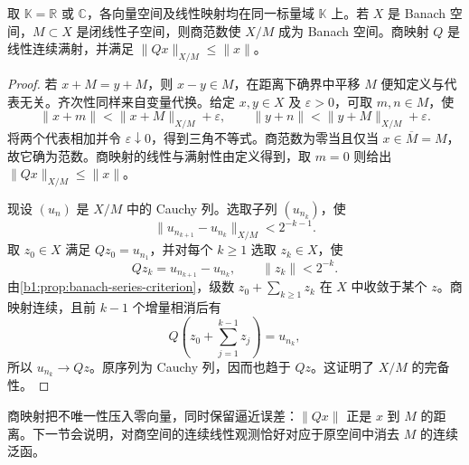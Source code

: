\begin{theorem}[闭子空间的商空间]\label{b1:thm:quotient-banach}
取 \(\mathbb K=\mathbb R\) 或 \(\mathbb C\)，各向量空间及线性映射均在同一标量域 \(\mathbb K\) 上。若 \(X\) 是 Banach 空间，\(M\subset X\) 是闭线性子空间，则商范数使 \(X/M\) 成为 Banach 空间。商映射 \(Q\) 是线性连续满射，并满足 \(\|Qx\|_{X/M}\leq\|x\|\)。
\end{theorem}
\begin{proof}
若 \(x+M=y+M\)，则 \(x-y\in M\)，在距离下确界中平移 \(M\) 便知定义与代表无关。齐次性同样来自变量代换。给定 \(x,y\in X\) 及 \(\varepsilon>0\)，可取 \(m,n\in M\)，使
\[
\|x+m\|<\|x+M\|_{X/M}+\varepsilon,
\qquad
\|y+n\|<\|y+M\|_{X/M}+\varepsilon.
\]
将两个代表相加并令 \(\varepsilon\downarrow0\)，得到三角不等式。商范数为零当且仅当 \(x\in\overline M=M\)，故它确为范数。商映射的线性与满射性由定义得到，取 \(m=0\) 则给出 \(\|Qx\|_{X/M}\leq\|x\|\)。

现设 \((u_n)\) 是 \(X/M\) 中的 Cauchy 列。选取子列 \((u_{n_k})\)，使
\[
\|u_{n_{k+1}}-u_{n_k}\|_{X/M}<2^{-k-1}.
\]
取 \(z_0\in X\) 满足 \(Qz_0=u_{n_1}\)，并对每个 \(k\geq1\) 选取 \(z_k\in X\)，使
\[
Qz_k=u_{n_{k+1}}-u_{n_k},\qquad \|z_k\|<2^{-k}.
\]
由\cref{b1:prop:banach-series-criterion}，级数 \(z_0+\sum_{k\geq1}z_k\) 在 \(X\) 中收敛于某个 \(z\)。商映射连续，且前 \(k-1\) 个增量相消后有
\[
Q\left(z_0+\sum_{j=1}^{k-1}z_j\right)=u_{n_k},
\]
所以 \(u_{n_k}\to Qz\)。原序列为 Cauchy 列，因而也趋于 \(Qz\)。这证明了 \(X/M\) 的完备性。
\end{proof}

商映射把不唯一性压入零向量，同时保留逼近误差：\(\|Qx\|\) 正是 \(x\) 到 \(M\) 的距离。下一节会说明，对商空间的连续线性观测恰好对应于原空间中消去 \(M\) 的连续泛函。
